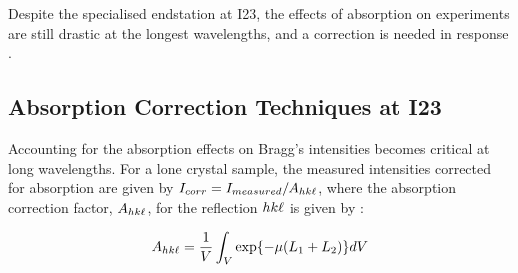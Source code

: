 
Despite the specialised endstation at I23, the effects of absorption on experiments are still drastic at the longest wavelengths, and a correction is needed in response \cite{Kazantsev2021}.

\subsection{Absorption Correction Techniques at I23}





Accounting for the absorption effects on Bragg’s intensities becomes critical at long wavelengths. For a lone crystal sample, the measured intensities corrected for absorption are given by $I_{corr} = I_{measured}/A_{hk\ell}$, where the absorption correction factor, $A_{hk\ell}$, for the reflection $hk\ell$ is given by \cite{Albrecht1939}: %

\begin{equation}
    A_{hk\ell} = \frac{1}{V} \int_V \exp{-\mu(L_1+L_2)} dV
    \label{AbsFactor}
\end{equation}

